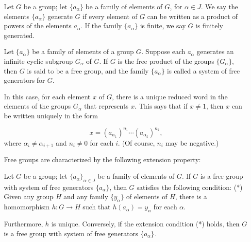 Let \(G\) be a group; let \(\{ a_{\alpha }\}\) be a family of elements of \(G\), for \(\alpha \in J\). We say the elements \(\{ a_{\alpha }\}\) generate \(G\) if every element of \(G\) can be written as a product of powers of the elements \(a_{\alpha }\). If the family \(\{ a_{\alpha }\}\) is finite, we say \(G\) is finitely generated.

\begin{definition}
Let \(\{ a_{\alpha }\}\) be a family of elements of a group \(G\). Suppose each \(a_{\alpha }\) generates an infinite cyclic subgroup \(G_{\alpha }\) of \(G\). If \(G\) is the free product of the groups \(\{ G_{\alpha }\}\), then \(G\) is said to be a free group, and the family \(\{ a_{\alpha }\}\) is called a system of free generators for \(G\).
\end{definition}

In this case, for each element \(x\) of \(G\), there is a unique reduced word in the elements of the groups \(G_{\alpha }\) that represents \(x\). This says that if \(x \neq 1\), then \(x\) can be written uniquely in the form

\[
x = {( a_{{\alpha }_{1}}) }^{n_{1}}\cdots {( a_{{\alpha }_{k}}) }^{n_{k}},
\]
where \({\alpha }_{i} \neq {\alpha }_{i + 1}\) and \(n_{i} \neq 0\) for each \(i\). (Of course, \(n_{i}\) may be negative.)

Free groups are characterized by the following extension property:

\begin{lemma}
\label{lem:\thetheorem}
Let \(G\) be a group; let \({\{ a_{\alpha }\} }_{\alpha \in J}\) be a family of elements of \(G\). If \(G\) is a free group with system of free generators \(\{ a_{\alpha }\}\), then \(G\) satisfies the following condition: (*) Given any group \(H\) and any family \(\{ y_{\alpha }\}\) of elements of \(H\), there is a homomorphism \(h : G \rightarrow H\) such that \(h( a_{\alpha }) = y_{\alpha }\) for each \(\alpha\).

Furthermore, \(h\) is unique. Conversely, if the extension condition (*) holds, then \(G\) is a free group with system of free generators \(\{ a_{\alpha }\}\).
\end{lemma}

